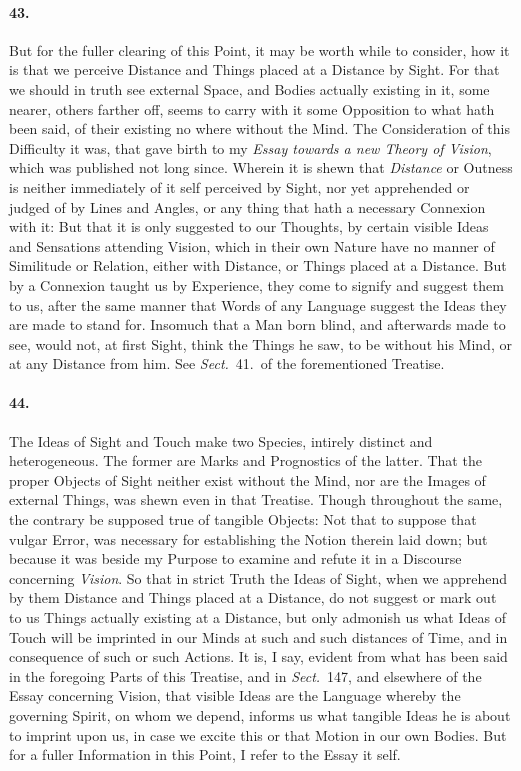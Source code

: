 \documentclass[]{article}
\newenvironment{sectionbody}{\begin{multicols}{2}}{\end{multicols}}
\begin{document}
\begin{sectionbody}
\paragraph{43.} But for the fuller clearing of this Point, it may be worth while
to consider, how it is that we perceive Distance and Things
placed at a Distance by Sight.  For that we should in truth see
external Space, and Bodies actually existing in it, some nearer,
others farther off, seems to carry with it some Opposition to
what hath been said, of their existing no where without the Mind.
The Consideration of this Difficulty it was, that gave birth to
my \emph{Essay towards a new Theory of Vision}, which was
published not long since.  Wherein it is shewn that
\emph{Distance} or Outness is neither immediately of it self
perceived by Sight, nor yet apprehended or judged of by Lines and
Angles, or any thing that hath a necessary Connexion with it: But
that it is only suggested to our Thoughts, by certain visible
Ideas and Sensations attending Vision, which in their own Nature
have no manner of Similitude or Relation, either with Distance,
or Things placed at a Distance.  But by a Connexion taught us by
Experience, they come to signify and suggest them to us, after
the same manner that Words of any Language suggest the Ideas they
are made to stand for.  Insomuch that a Man born blind, and
afterwards made to see, would not, at first Sight, think the
Things he saw, to be without his Mind, or at any Distance from
him.  See \emph{Sect.}~41.\ of the forementioned Treatise.



\paragraph{44.} The Ideas of Sight and Touch make two Species, intirely distinct
and heterogeneous.  The former are Marks and Prognostics of the
latter.  That the proper Objects of Sight neither exist without
the Mind, nor are the Images of external Things, was shewn even
in that Treatise.  Though throughout the same, the contrary be
supposed true of tangible Objects: Not that to suppose that
vulgar Error, was necessary for establishing the Notion therein
laid down; but because it was beside my Purpose to examine and
refute it in a Discourse concerning \emph{Vision}.  So that in
strict Truth the Ideas of Sight, when we apprehend by them
Distance and Things placed at a Distance, do not suggest or mark
out to us Things actually existing at a Distance, but only
admonish us what Ideas of Touch will be imprinted in our Minds at
such and such distances of Time, and in consequence of such or
such Actions.  It is, I say, evident from what has been said in
the foregoing Parts of this Treatise, and in \emph{Sect.}~147,
and elsewhere of the Essay concerning Vision, that visible Ideas
are the Language whereby the governing Spirit, on whom we depend,
informs us what tangible Ideas he is about to imprint upon us, in
case we excite this or that Motion in our own Bodies.  But for a
fuller Information in this Point, I refer to the Essay it self.




\end{sectionbody}
\end{document}
